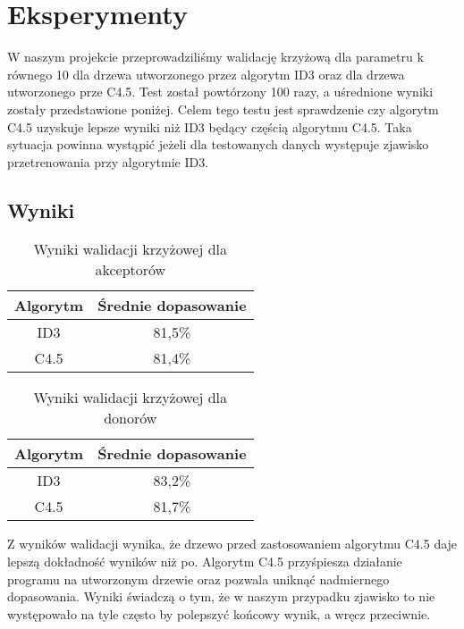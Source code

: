\section{Eksperymenty}
W naszym projekcie przeprowadziliśmy walidację krzyżową dla parametru k równego 10 dla drzewa utworzonego przez algorytm ID3 oraz dla drzewa utworzonego prze C4.5. Test został powtórzony 100 razy, a uśrednione wyniki zostały przedstawione poniżej.
Celem tego testu jest sprawdzenie czy algorytm C4.5 uzyskuje lepsze wyniki niż ID3 będący częścią algorytmu C4.5. Taka sytuacja powinna wystąpić jeżeli dla testowanych danych występuje zjawisko przetrenowania przy algorytmie ID3.
\subsection{Wyniki}



\begin{table}[H]
    \centering
    \begin{tabular}{|c|c|}
    \hline
    Algorytm                & Średnie dopasowanie \\ \hline
    ID3                     & 81,5\%              \\ \hline
    C4.5                    & 81,4\%              \\ \hline
    \end{tabular}
    \caption{Wyniki walidacji krzyżowej dla akceptorów}
    \label{tab:crossing}
\end{table}

\begin{table}[H]
    \centering
    \begin{tabular}{|c|c|}
    \hline
    Algorytm                & Średnie dopasowanie \\ \hline
    ID3                     & 83,2\%              \\ \hline
    C4.5                    & 81,7\%              \\ \hline
    \end{tabular}
    \caption{Wyniki walidacji krzyżowej dla donorów}
    \label{tab:crossing}
\end{table}

Z wyników walidacji wynika, że drzewo przed zastosowaniem algorytmu C4.5 daje lepszą dokładność wyników niż po. Algorytm C4.5 przyśpiesza działanie programu na utworzonym drzewie oraz pozwala uniknąć nadmiernego dopasowania. Wyniki świadczą o tym, że w naszym przypadku zjawisko to nie występowało na tyle często by polepszyć końcowy wynik, a wręcz przeciwnie.


